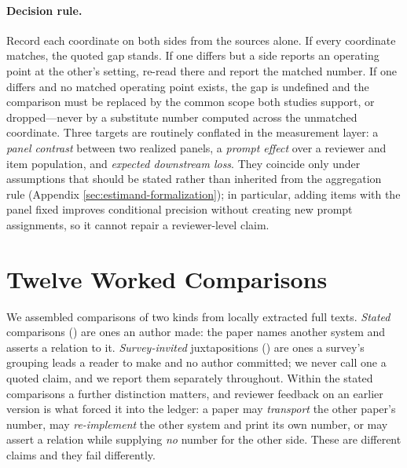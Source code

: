 \documentclass[11pt]{article}
\begin{document}
\paragraph{Decision rule.}
Record each coordinate on both sides from the sources alone. If every
coordinate matches, the quoted gap stands. If one differs but a side reports an
operating point at the other's setting, re-read there and report the matched
number. If one differs and no matched operating point exists, the gap is
undefined and the comparison must be replaced by the common scope both studies
support, or dropped---never by a substitute number computed across the
unmatched coordinate. Three targets are routinely conflated in the measurement
layer: a \emph{panel contrast} between two realized panels, a \emph{prompt
effect} over a reviewer and item population, and \emph{expected downstream
loss}. They coincide only under assumptions that should be stated rather than
inherited from the aggregation rule (Appendix
\ref{sec:estimand-formalization}); in particular, adding items with the panel
fixed improves conditional precision without creating new prompt assignments,
so it cannot repair a reviewer-level claim.



\section{Twelve Worked Comparisons}
\label{sec:cases}

We assembled comparisons of two kinds from \FrameScreened{} locally extracted
full texts. \emph{Stated} comparisons (\LedgerStated{}) are ones an author made:
the paper names another system and asserts a relation to it.
\emph{Survey-invited} juxtapositions (\LedgerInvited{}) are ones a survey's
grouping leads a reader to make and no author committed; we never call one a
quoted claim, and we report them separately throughout. Within the stated
comparisons a further distinction matters, and reviewer feedback on an earlier
version is what forced it into the ledger: a paper may \emph{transport} the
other paper's number, may \emph{re-implement} the other system and print its
own number, or may assert a relation while supplying \emph{no} number for the
other side. These are different claims and they fail differently.
\end{document}
